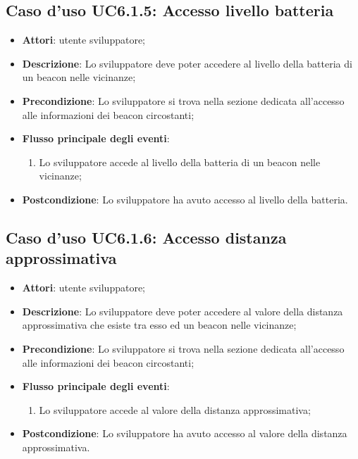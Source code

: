 \documentclass[../AnalisiDeiRequisiti.tex]{subfiles}
\begin{document}
\subsection{Caso d'uso UC6.1.5: Accesso livello batteria}

\begin{itemize}
\item \textbf{Attori}: utente sviluppatore;
\item \textbf{Descrizione}: Lo sviluppatore deve poter accedere al livello della batteria di un beacon nelle vicinanze; 
      \item \textbf{Precondizione}: Lo sviluppatore si trova nella sezione dedicata all'accesso alle informazioni dei beacon circostanti;

        \item \textbf{Flusso principale degli eventi}:
          \begin{enumerate}
          \item Lo sviluppatore accede al livello della batteria di un beacon nelle vicinanze;

      \end{enumerate}
    \item \textbf{Postcondizione}: Lo sviluppatore ha avuto accesso al livello della batteria.
  \end{itemize}
\hypertarget{UC6.1.6}{}
\subsection{Caso d'uso UC6.1.6: Accesso distanza approssimativa}
\begin{itemize}
\item \textbf{Attori}: utente sviluppatore;
\item \textbf{Descrizione}: Lo sviluppatore deve poter accedere al valore della distanza approssimativa che esiste tra esso ed un beacon nelle vicinanze; 
      \item \textbf{Precondizione}: Lo sviluppatore si trova nella sezione dedicata all'accesso alle informazioni dei beacon circostanti;

        \item \textbf{Flusso principale degli eventi}:
          \begin{enumerate}
          \item Lo sviluppatore accede al valore della distanza approssimativa;

      \end{enumerate}
    \item \textbf{Postcondizione}: Lo sviluppatore ha avuto accesso al valore della distanza approssimativa.
  \end{itemize}
\hypertarget{UC6.1.7}{}
\end{document}
